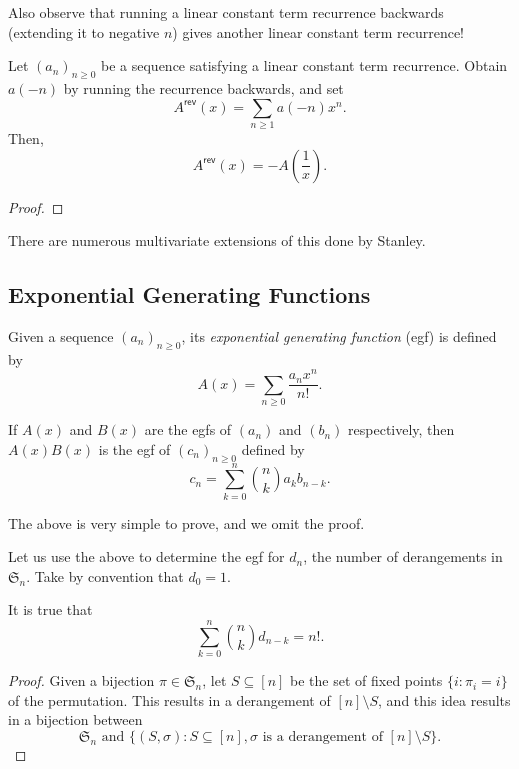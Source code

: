 	Also observe that running a linear constant term recurrence backwards (extending it to negative $n$) gives another linear constant term recurrence!

	\begin{ftheo}
	 	Let $(a_n)_{n \ge 0}$ be a sequence satisfying a linear constant term recurrence. Obtain $a(-n)$ by running the recurrence backwards, and set
	 	\[ A^\mathsf{rev}(x) = \sum_{n \ge 1} a(-n) x^n. \]
	 	Then,
	 	\[ A^\mathsf{rev}(x) = -A\left( \frac{1}{x} \right). \]
	 \end{ftheo}
	 \begin{proof}
	 	
	 \end{proof}

	 There are numerous multivariate extensions of this done by Stanley.

\subsection{Exponential Generating Functions}

	\begin{fdef}
		Given a sequence $(a_n)_{n \ge 0}$, its \emph{exponential generating function} (egf) is defined by
		\[ A(x) = \sum_{n\ge 0} \frac{a_n x^n}{n!}. \]
	\end{fdef}

	\begin{flem}
		\label{lem: product of egfs}
		If $A(x)$ and $B(x)$ are the egfs of $(a_n)$ and $(b_n)$ respectively, then $A(x)B(x)$ is the egf of $(c_n)_{n \ge 0}$ defined by
		\[ c_n = \sum_{k=0}^n \binom{n}{k} a_k b_{n-k}. \]
	\end{flem}
	The above is very simple to prove, and we omit the proof.

	Let us use the above to determine the egf for $d_n$, the number of derangements in $\mathfrak{S}_n$. Take by convention that $d_0 = 1$.
	\begin{prop}
		It is true that
		\[ \sum_{k=0}^n \binom{n}{k} d_{n-k} = n!. \]
	\end{prop}
	\begin{proof}
		Given a bijection $\pi \in \mathfrak{S}_n$, let $S \subseteq [n]$ be the set of fixed points $\{ i : \pi_i = i \}$ of the permutation. This results in a derangement of $[n] \setminus S$, and this idea results in a bijection between
		\[ \mathfrak{S}_n \text{ and } \{ (S,\sigma) : S \subseteq [n], \sigma\text{ is a derangement of $[n] \setminus S$} \}. \]
	\end{proof}


